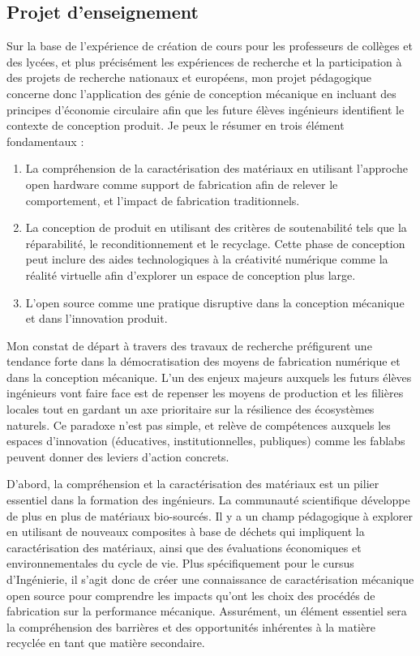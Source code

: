 \documentclass[
  11pt,
]{article}
\providecommand{\tightlist}{%
  \setlength{\itemsep}{0pt}\setlength{\parskip}{0pt}}\usepackage{longtable,booktabs,array}
\begin{document}
\hypertarget{projet-denseignement}{%
\subsection{Projet d'enseignement}\label{projet-denseignement}}

Sur la base de l'expérience de création de cours pour les professeurs de
collèges et des lycées, et plus précisément les expériences de recherche
et la participation à des projets de recherche nationaux et européens,
mon projet pédagogique concerne donc l'application des génie de
conception mécanique en incluant des principes d'économie circulaire
afin que les future élèves ingénieurs identifient le contexte de
conception produit. Je peux le résumer en trois élément fondamentaux :

\begin{enumerate}
\def\labelenumi{\arabic{enumi}.}
\tightlist
\item
  La compréhension de la caractérisation des matériaux en utilisant
  l'approche open hardware comme support de fabrication afin de relever
  le comportement, et l'impact de fabrication traditionnels.
\item
  La conception de produit en utilisant des critères de soutenabilité
  tels que la réparabilité, le reconditionnement et le recyclage. Cette
  phase de conception peut inclure des aides technologiques à la
  créativité numérique comme la réalité virtuelle afin d'explorer un
  espace de conception plus large.
\item
  L'open source comme une pratique disruptive dans la conception
  mécanique et dans l'innovation produit.
\end{enumerate}

Mon constat de départ à travers des travaux de recherche préfigurent une
tendance forte dans la démocratisation des moyens de fabrication
numérique et dans la conception mécanique. L'un des enjeux majeurs
auxquels les futurs élèves ingénieurs vont faire face est de repenser
les moyens de production et les filières locales tout en gardant un axe
prioritaire sur la résilience des écosystèmes naturels. Ce paradoxe
n'est pas simple, et relève de compétences auxquels les espaces
d'innovation (éducatives, institutionnelles, publiques) comme les
fablabs peuvent donner des leviers d'action concrets.

D'abord, la compréhension et la caractérisation des matériaux est un
pilier essentiel dans la formation des ingénieurs. La communauté
scientifique développe de plus en plus de matériaux bio-sourcés. Il y a
un champ pédagogique à explorer en utilisant de nouveaux composites à
base de déchets qui impliquent la caractérisation des matériaux, ainsi
que des évaluations économiques et environnementales du cycle de vie.
Plus spécifiquement pour le cursus d'Ingénierie, il s'agit donc de créer
une connaissance de caractérisation mécanique open source pour
comprendre les impacts qu'ont les choix des procédés de fabrication sur
la performance mécanique. Assurément, un élément essentiel sera la
compréhension des barrières et des opportunités inhérentes à la matière
recyclée en tant que matière secondaire.
\end{document}
